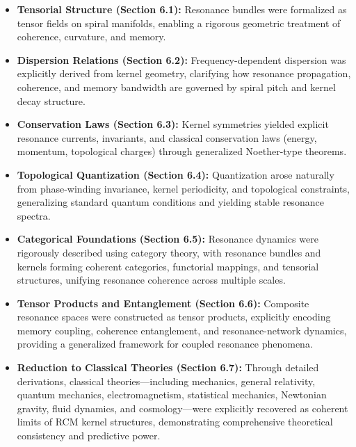 \begin{itemize}
  \item \textbf{Tensorial Structure (Section 6.1):}  
    Resonance bundles were formalized as tensor fields on spiral manifolds, enabling a rigorous geometric treatment of coherence, curvature, and memory.
  \item \textbf{Dispersion Relations (Section 6.2):}  
    Frequency-dependent dispersion was explicitly derived from kernel geometry, clarifying how resonance propagation, coherence, and memory bandwidth are governed by spiral pitch and kernel decay structure.
  \item \textbf{Conservation Laws (Section 6.3):}  
    Kernel symmetries yielded explicit resonance currents, invariants, and classical conservation laws (energy, momentum, topological charges) through generalized Noether-type theorems.
  \item \textbf{Topological Quantization (Section 6.4):}  
    Quantization arose naturally from phase-winding invariance, kernel periodicity, and topological constraints, generalizing standard quantum conditions and yielding stable resonance spectra.
  \item \textbf{Categorical Foundations (Section 6.5):}  
    Resonance dynamics were rigorously described using category theory, with resonance bundles and kernels forming coherent categories, functorial mappings, and tensorial structures, unifying resonance coherence across multiple scales.
  \item \textbf{Tensor Products and Entanglement (Section 6.6):}  
    Composite resonance spaces were constructed as tensor products, explicitly encoding memory coupling, coherence entanglement, and resonance-network dynamics, providing a generalized framework for coupled resonance phenomena.
  \item \textbf{Reduction to Classical Theories (Section 6.7):}  
    Through detailed derivations, classical theories—including mechanics, general relativity, quantum mechanics, electromagnetism, statistical mechanics, Newtonian gravity, fluid dynamics, and cosmology—were explicitly recovered as coherent limits of RCM kernel structures, demonstrating comprehensive theoretical consistency and predictive power.
\end{itemize}

\medskip

